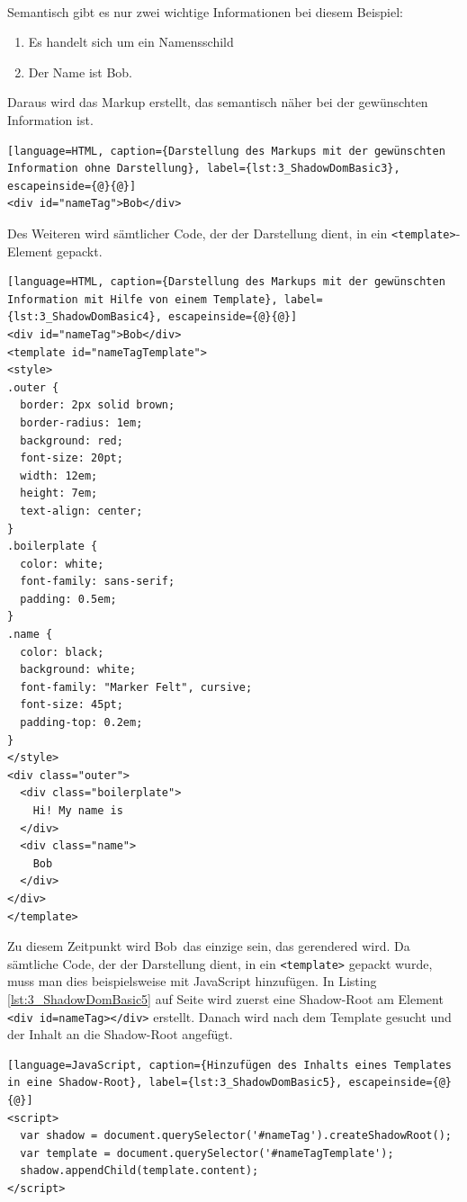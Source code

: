 \begin{enumerate}
 \hfill \\
Semantisch gibt es nur zwei wichtige Informationen bei diesem Beispiel:
\begin{enumerate}
\item Es handelt sich um ein Namensschild
\item Der Name ist \glqq Bob\grqq .
\end{enumerate}
Daraus wird das Markup erstellt, das semantisch näher bei der gewünschten Information ist.

\begin{lstlisting}[language=HTML, caption={Darstellung des Markups mit der gewünschten Information ohne Darstellung}, label={lst:3_ShadowDomBasic3}, escapeinside={@}{@}]
<div id="nameTag">Bob</div>
\end{lstlisting}

Des Weiteren wird sämtlicher Code, der der Darstellung dient, in ein \lstinline|<template>|-Element gepackt.

\begin{lstlisting}[language=HTML, caption={Darstellung des Markups mit der gewünschten Information mit Hilfe von einem Template}, label={lst:3_ShadowDomBasic4}, escapeinside={@}{@}]
<div id="nameTag">Bob</div>
<template id="nameTagTemplate">
<style>
.outer {
  border: 2px solid brown;
  border-radius: 1em;
  background: red;
  font-size: 20pt;
  width: 12em;
  height: 7em;
  text-align: center;
}
.boilerplate {
  color: white;
  font-family: sans-serif;
  padding: 0.5em;
}
.name {
  color: black;
  background: white;
  font-family: "Marker Felt", cursive;
  font-size: 45pt;
  padding-top: 0.2em;
}
</style>
<div class="outer">
  <div class="boilerplate">
    Hi! My name is
  </div>
  <div class="name">
    Bob
  </div>
</div>
</template>
\end{lstlisting}

Zu diesem Zeitpunkt wird \glqq Bob\grqq\ das einzige sein, das gerendered wird. Da sämtliche Code, der der Darstellung dient, in ein \lstinline|<template>| gepackt wurde, muss man dies beispielsweise mit JavaScript hinzufügen. In Listing \ref{lst:3_ShadowDomBasic5} auf Seite \pageref{lst:3_ShadowDomBasic5} wird zuerst eine Shadow-Root am Element \lstinline|<div id=nameTag></div>| erstellt. Danach wird nach dem Template gesucht und der Inhalt an die Shadow-Root angefügt.

\begin{lstlisting}[language=JavaScript, caption={Hinzufügen des Inhalts eines Templates in eine Shadow-Root}, label={lst:3_ShadowDomBasic5}, escapeinside={@}{@}]
<script>
  var shadow = document.querySelector('#nameTag').createShadowRoot();
  var template = document.querySelector('#nameTagTemplate');
  shadow.appendChild(template.content);
</script>
\end{lstlisting}


\end{enumerate}
